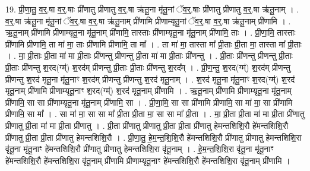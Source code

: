 \documentclass[17pt]{extarticle}
\begin{document}
19. प्री॒णा॒तु॒ व॒र्॒.षा व॒र्॒.षाः प्री॑णातु प्रीणातु व॒र्॒.षा ऋ॑तू॒ना मृ॑तू॒नां ॅव॒र्॒.षाः प्री॑णातु प्रीणातु व॒र्॒.षा ऋ॑तू॒नाम् । . व॒र्॒.षा ऋ॑तू॒ना मृ॑तू॒नां ॅव॒र्॒.षा व॒र्॒.षा ऋ॑तू॒नाम् प्री॑णामि प्रीणाम्यृतू॒नां ॅव॒र्॒.षा व॒र्॒.षा ऋ॑तू॒नाम् प्री॑णामि । . ऋ॒तू॒नाम् प्री॑णामि प्रीणाम्यृतू॒ना मृ॑तू॒नाम् प्री॑णामि॒ तास्ताः प्री॑णाम्यृतू॒ना मृ॑तू॒नाम् प्री॑णामि॒ ताः । . प्री॒णा॒मि॒ तास्ताः प्री॑णामि प्रीणामि॒ ता मा॑ मा॒ ताः प्री॑णामि प्रीणामि॒ ता मा᳚ । . ता मा॑ मा॒ तास्ता मा᳚ प्री॒ताः प्री॒ता मा॒ तास्ता मा᳚ प्री॒ताः । . मा॒ प्री॒ताः प्री॒ता मा॑ मा प्री॒ताः प्री॑णन्तु प्रीणन्तु प्री॒ता मा॑ मा प्री॒ताः प्री॑णन्तु । . प्री॒ताः प्री॑णन्तु प्रीणन्तु प्री॒ताः प्री॒ताः प्री॑णन्तु श॒रद(ग्म्॑) श॒रद॑म् प्रीणन्तु प्री॒ताः प्री॒ताः प्री॑णन्तु श॒रद᳚म् । . प्री॒ण॒न्तु॒ श॒रद(ग्म्॑) श॒रद॑म् प्रीणन्तु प्रीणन्तु श॒रद॑ मृतू॒ना मृ॑तू॒नाꣳ श॒रद॑म् प्रीणन्तु प्रीणन्तु श॒रद॑ मृतू॒नाम् । . श॒रद॑ मृतू॒ना मृ॑तू॒नाꣳ श॒रद(ग्म्॑) श॒रद॑ मृतू॒नाम् प्री॑णामि प्रीणाम्यृतू॒नाꣳ श॒रद(ग्म्॑) श॒रद॑ मृतू॒नाम् प्री॑णामि । . ऋ॒तू॒नाम् प्री॑णामि प्रीणाम्यृतू॒ना मृ॑तू॒नाम् प्री॑णामि॒ सा सा प्री॑णाम्यृतू॒ना मृ॑तू॒नाम् प्री॑णामि॒ सा । . प्री॒णा॒मि॒ सा सा प्री॑णामि प्रीणामि॒ सा मा॑ मा॒ सा प्री॑णामि प्रीणामि॒ सा मा᳚ । . सा मा॑ मा॒ सा सा मा᳚ प्री॒ता प्री॒ता मा॒ सा सा मा᳚ प्री॒ता । . मा॒ प्री॒ता प्री॒ता मा॑ मा प्री॒ता प्री॑णातु प्रीणातु प्री॒ता मा॑ मा प्री॒ता प्री॑णातु । . प्री॒ता प्री॑णातु प्रीणातु प्री॒ता प्री॒ता प्री॑णातु हेमन्तशिशि॒रौ हे॑मन्तशिशि॒रौ प्री॑णातु प्री॒ता प्री॒ता प्री॑णातु हेमन्तशिशि॒रौ । . प्री॒णा॒तु॒ हे॒म॒न्त॒शि॒शि॒रौ हे॑मन्तशिशि॒रौ प्री॑णातु प्रीणातु हेमन्तशिशि॒रा वृ॑तू॒ना मृ॑तू॒नाꣳ हे॑मन्तशिशि॒रौ प्री॑णातु प्रीणातु हेमन्तशिशि॒रा वृ॑तू॒नाम् । . हे॒म॒न्त॒शि॒शि॒रा वृ॑तू॒ना मृ॑तू॒नाꣳ हे॑मन्तशिशि॒रौ हे॑मन्तशिशि॒रा वृ॑तू॒नाम् प्री॑णामि प्रीणाम्यृतू॒नाꣳ हे॑मन्तशिशि॒रौ हे॑मन्तशिशि॒रा वृ॑तू॒नाम् प्री॑णामि । \newline
\end{document}
